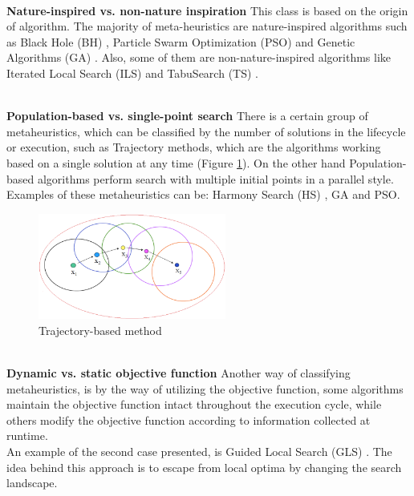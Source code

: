 ~\\
\textbf{Nature-inspired vs. non-nature inspiration }
This class is based on the origin of algorithm. The majority of meta-heuristics are nature-inspired algorithms such as Black Hole (BH) \cite{Rubio2016}, Particle Swarm Optimization (PSO) \cite{Duran:2010:CPS:1645454.1645859} and Genetic Algorithms (GA) \cite{DBLP:conf/icsi/CrawfordSPJPO14}. Also, some of them are non-nature-inspired algorithms like Iterated Local Search (ILS) \cite{DBLP:journals/networks/AringhieriGHS16} and TabuSearch (TS) \cite{DBLP:journals/eswa/SotoCGMP13}.

~\\
\textbf{Population-based vs. single-point search}
There is a certain group of metaheuristics, which can be classified by the number of solutions in the lifecycle or execution, such as Trajectory methods, which are the algorithms working based on a single solution at any time (Figure \ref{fig:trajectory-method}). On the other hand Population-based algorithms perform search with multiple initial points in a parallel style. Examples of these metaheuristics can be: Harmony Search (HS) \cite{DBLP:conf/ccece/Al-AjmiE14}, GA \cite{Aupetit2008} and PSO. 

\squeezeup
\begin{figure}[H]
	\centering
  \includegraphics[width=0.55\textwidth]{MarcoTeorico/imagenes/trajectory-mh.png}
	\caption{Trajectory-based method}\label{fig:trajectory-method}
\end{figure}
\squeezeup

~\\
\textbf{Dynamic vs. static objective function}
Another way of classifying metaheuristics, is by the way of utilizing the objective function, some algorithms maintain the objective function intact throughout the execution cycle, while others modify the objective function according to information collected at runtime.\\
An example of the second case presented, is Guided Local Search (GLS) \cite{DBLP:journals/eor/VansteenwegenSBO09}.  The idea behind this approach is to escape from local optima by changing the search landscape. 

